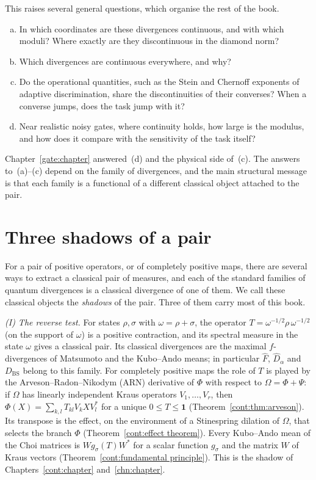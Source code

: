 This raises several general questions, which organise the rest of the book.
\begin{enumerate}[(a)]
\item In which coordinates are these divergences continuous, and with which moduli? Where exactly are they discontinuous in the diamond norm?
\item Which divergences are continuous everywhere, and why?
\item Do the operational quantities, such as the Stein and Chernoff exponents of adaptive discrimination, share the discontinuities of their converses? When a converse jumps, does the task jump with it?
\item Near realistic noisy gates, where continuity holds, how large is the modulus, and how does it compare with the sensitivity of the task itself?
\end{enumerate}
Chapter~\ref{gate:chapter} answered~(d) and the physical side of~(c). The answers to~(a)--(c) depend on the family of divergences, and the main structural message is that each family is a functional of a different classical object attached to the pair.

\section{Three shadows of a pair}\label{ov:sec:shadows}

For a pair of positive operators, or of completely positive maps, there are several ways to extract a classical pair of measures, and each of the standard families of quantum divergences is a classical divergence of one of them. We call these classical objects the \emph{shadows} of the pair. Three of them carry most of this book.

\emph{(I) The reverse test.} For states $\rho,\sigma$ with $\omega=\rho+\sigma$, the operator $T=\omega^{-1/2}\rho\,\omega^{-1/2}$ (on the support of $\omega$) is a positive contraction, and its spectral measure in the state $\omega$ gives a classical pair. Its classical divergences are the maximal $f$-divergences of Matsumoto \cite{Matsumoto2018newf} and the Kubo--Ando means; in particular $\widehat F$, $\widehat D_\alpha$ and $D_{\mathrm{BS}}$ belong to this family. For completely positive maps the role of $T$ is played by the Arveson--Radon--Nikodym (ARN) derivative of $\Phi$ with respect to $\Omega=\Phi+\Psi$: if $\Omega$ has linearly independent Kraus operators $V_1,\dots,V_r$, then $\Phi(X)=\sum_{k,l}T_{kl}V_kXV_l^*$ for a unique $0\le T\le\mathbf 1$ (Theorem~\ref{cont:thm:arveson}). Its transpose is the effect, on the environment of a Stinespring dilation of $\Omega$, that selects the branch $\Phi$ (Theorem~\ref{cont:effect theorem}). Every Kubo--Ando mean of the Choi matrices is $W g_\sigma(T)W^*$ for a scalar function $g_\sigma$ and the matrix $W$ of Kraus vectors (Theorem~\ref{cont:fundamental principle}). This is the shadow of Chapters~\ref{cont:chapter} and~\ref{chn:chapter}.

